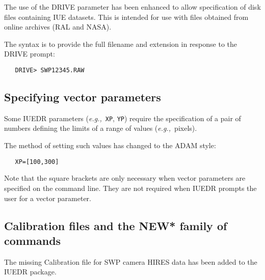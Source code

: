 The use of the DRIVE parameter has been enhanced to allow
specification of disk files containing IUE datasets. This is intended
for use with  files obtained from online archives (RAL and NASA).

The syntax is to provide the full filename and extension in response to
the DRIVE prompt:

\begin{verbatim}
   DRIVE> SWP12345.RAW
\end{verbatim}

\subsection{Specifying vector parameters}

Some IUEDR parameters ({\it{e.g.,}}\ \verb+XP+, \verb+YP+) require the
specification of a pair of numbers defining the limits of a range of values
({\it{e.g.,}}\ pixels).

The method of setting such values has changed to the ADAM style:

\begin{verbatim}
   XP=[100,300]
\end{verbatim}

Note that the square brackets are only necessary when vector
parameters are specified on the command line. They are not required
when IUEDR prompts the user for a vector parameter.

\subsection{Calibration files and the NEW* family of commands}

The missing Calibration file for SWP camera HIRES data has been added to the
IUEDR package.

